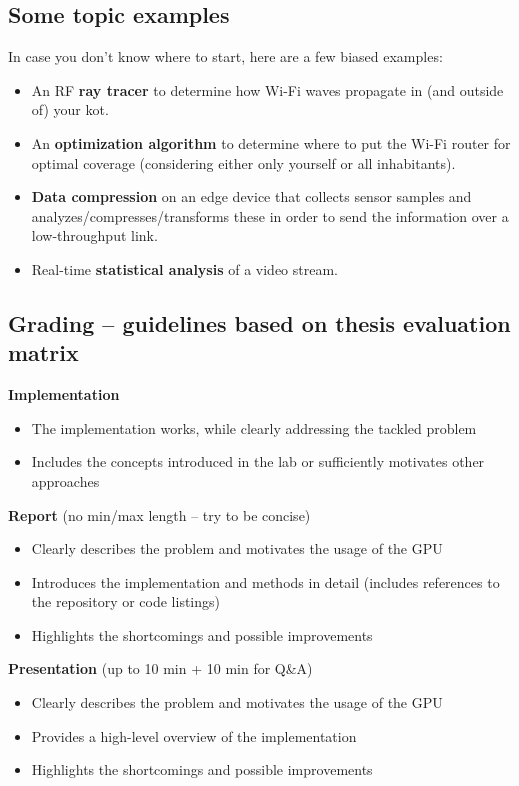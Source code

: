 \subsection{Some topic examples}
In case you don't know where to start, here are a few biased examples:
\begin{itemize}
  \item An RF \textbf{ray tracer} to determine how Wi-Fi waves propagate in (and outside of) your kot.
  \item An \textbf{optimization algorithm} to determine where to put the Wi-Fi router for optimal coverage (considering either only yourself or all inhabitants).
  \item \textbf{Data compression} on an edge device that collects sensor samples and analyzes/compresses/transforms these in order to send the information over a low-throughput link.
  \item Real-time \textbf{statistical analysis} of a video stream.
\end{itemize}

\subsection{Grading -- guidelines based on thesis evaluation matrix}

\textbf{Implementation}
\begin{itemize}[nosep]
  \item The implementation works, while clearly addressing the tackled problem
  \item Includes the concepts introduced in the lab or sufficiently motivates other approaches
\end{itemize}

\textbf{Report} (no min/max length -- try to be concise)
\begin{itemize}[nosep]
  \item Clearly describes the problem and motivates the usage of the GPU
  \item Introduces the implementation and methods in detail (includes references to the repository or code listings)
  \item Highlights the shortcomings and possible improvements
\end{itemize}

\textbf{Presentation} (up to 10 min + 10 min for Q\&A)
\begin{itemize}[nosep]
  \item Clearly describes the problem and motivates the usage of the GPU
  \item Provides a high-level overview of the implementation
  \item Highlights the shortcomings and possible improvements
\end{itemize}


